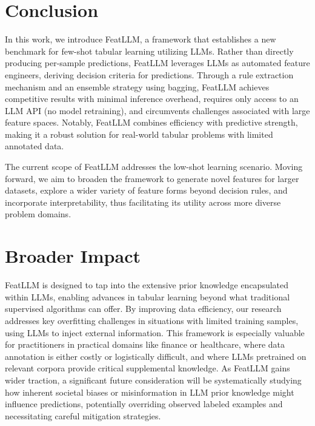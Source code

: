 \section{Conclusion}
In this work, we introduce \textsf{FeatLLM}, a framework that establishes a new benchmark for few-shot tabular learning utilizing LLMs. Rather than directly producing per-sample predictions, \textsf{FeatLLM} leverages LLMs as automated feature engineers, deriving decision criteria for predictions. Through a rule extraction mechanism and an ensemble strategy using bagging, \textsf{FeatLLM} achieves competitive results with minimal inference overhead, requires only access to an LLM API (no model retraining), and circumvents challenges associated with large feature spaces. Notably, \textsf{FeatLLM} combines efficiency with predictive strength, making it a robust solution for real-world tabular problems with limited annotated data.

The current scope of \textsf{FeatLLM} addresses the low-shot learning scenario. Moving forward, we aim to broaden the framework to generate novel features for larger datasets, explore a wider variety of feature forms beyond decision rules, and incorporate interpretability, thus facilitating its utility across more diverse problem domains.

\section{Broader Impact}
\textsf{FeatLLM} is designed to tap into the extensive prior knowledge encapsulated within LLMs, enabling advances in tabular learning beyond what traditional supervised algorithms can offer. By improving data efficiency, our research addresses key overfitting challenges in situations with limited training samples, using LLMs to inject external information. This framework is especially valuable for practitioners in practical domains like finance or healthcare, where data annotation is either costly or logistically difficult, and where LLMs pretrained on relevant corpora provide critical supplemental knowledge. As \textsf{FeatLLM} gains wider traction, a significant future consideration will be systematically studying how inherent societal biases or misinformation in LLM prior knowledge might influence predictions, potentially overriding observed labeled examples and necessitating careful mitigation strategies.

